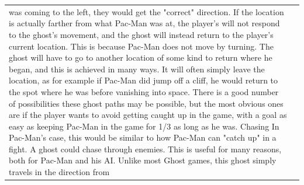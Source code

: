 \documentclass{article}
\begin{document}
\begin{table}[t]
\begin{center}
\begin{tabular}{|p{8cm}|p{8cm}|}
 was coming to the left, they would get the "correct" direction. \newline\newline If the location is actually farther from what Pac-Man was at, the player's will not respond to the ghost's movement, and the ghost will instead return to the player's current location. This is because Pac-Man does not move by turning.  \newline\newline The ghost will have to go to another location of some kind to return where he began, and this is achieved in many ways. It will often simply leave the location, as for example if Pac-Man did jump off a cliff, he would return to the spot where he was before vanishing into space. There is a good number of possibilities these ghost paths may be possible, but the most obvious ones are if the player wants to avoid getting caught up in the game, with a goal as easy as keeping Pac-Man in the game for 1/3 as long as he was. \newline\newline Chasing  \newline\newline In Pac-Man's case, this would be similar to how Pac-Man can "catch up" in a fight.  \newline\newline A ghost could chase through enemies. This is useful for many reasons, both for Pac-Man and his AI. Unlike most Ghost games, this ghost simply travels in the direction from


\end{tabular}
\end{center}
\end{table}
\end{document}
